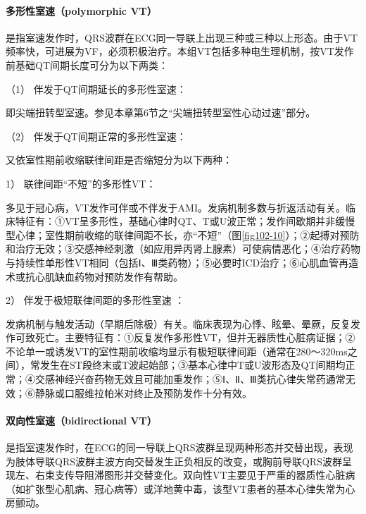 \paragraph{多形性室速（polymorphic VT）}

是指室速发作时，QRS波群在ECG同一导联上出现三种或三种以上形态。由于VT频率快，可进展为VF，必须积极治疗。本组VT包括多种电生理机制，按VT发作前基础QT间期长度可分为以下两类：

\hypertarget{text00292.htmlux5cux23CHP10-2-5-2-3-7-2-1}{}
（1） 伴发于QT间期延长的多形性室速：

即尖端扭转型室速。参见本章第6节之“尖端扭转型室性心动过速”部分。

\hypertarget{text00292.htmlux5cux23CHP10-2-5-2-3-7-2-2}{}
（2） 伴发于QT间期正常的多形性室速：

又依室性期前收缩联律间距是否缩短分为以下两种：

\hypertarget{text00292.htmlux5cux23CHP10-2-5-2-3-7-2-2-1}{}
1） 联律间距“不短”的多形性VT：

多见于冠心病，VT发作可伴或不伴发于AMI。发病机制多数与折返活动有关。临床特征有：①VT呈多形性，基础心律时QT、T或U波正常；发作间歇期并非缓慢型心律；室性期前收缩的联律间距不长，亦“不短”（图\ref{fig102-10}）；②起搏对预防和治疗无效；③交感神经刺激（如应用异丙肾上腺素）可使病情恶化；④治疗药物与持续性单形性VT相同（包括Ⅰ、Ⅲ类药物）；⑤必要时ICD治疗；⑥心肌血管再造术或抗心肌缺血药物对预防发作有帮助。

\hypertarget{text00292.htmlux5cux23CHP10-2-5-2-3-7-2-2-2}{}
2） 伴发于极短联律间距的多形性室速 ：

发病机制与触发活动（早期后除极）有关。临床表现为心悸、眩晕、晕厥，反复发作可致死亡。主要特征有：①反复发作多形性VT，但并无器质性心脏病证据；②不论单一或诱发VT的室性期前收缩均显示有极短联律间距（通常在280～320ms之间），常发生在ST段终末或T波起始部；③基本心律中T或U波形态及QT间期均正常；④交感神经兴奋药物无效且可能加重发作；⑤Ⅰ、Ⅱ、Ⅲ类抗心律失常药通常无效；⑥静脉或口服维拉帕米对终止及预防发作十分有效。

\paragraph{双向性室速（bidirectional VT）}

是指室速发作时，在ECG的同一导联上QRS波群呈现两种形态并交替出现，表现为肢体导联QRS波群主波方向交替发生正负相反的改变，或胸前导联QRS波群呈现左、右束支传导阻滞图形并交替变化。双向性VT主要见于严重的器质性心脏病（如扩张型心肌病、冠心病等）或洋地黄中毒，该型VT患者的基本心律失常为心房颤动。

